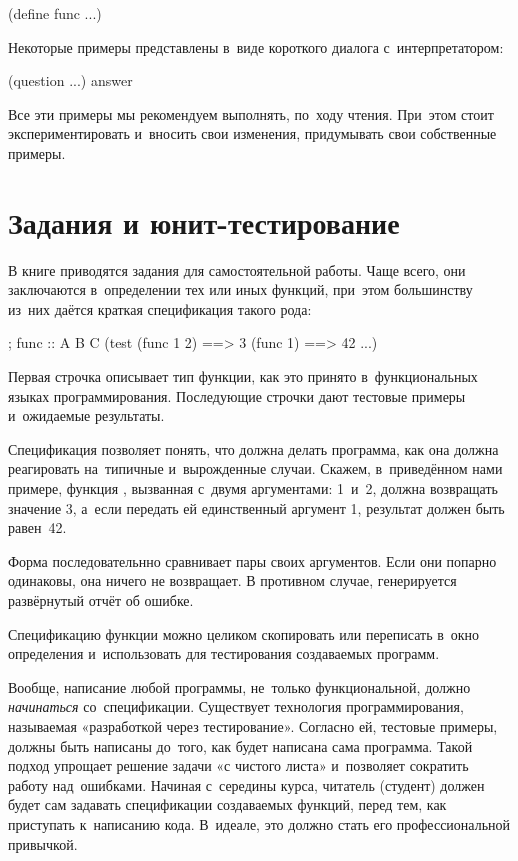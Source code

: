 \begin{Definition}
(define func
 ...)
\end{Definition}

Некоторые примеры представлены в~виде короткого диалога с~интерпретатором:

\REPL
  {(question ...)}
  {answer}

Все эти примеры мы рекомендуем выполнять, по~ходу чтения. При~этом стоит экспериментировать и~вносить свои изменения, придумывать свои собственные примеры.

\section{Задания и юнит-тестирование}%
В книге приводятся задания для самостоятельной работы. Чаще всего, они заключаются в~определении тех или иных функций, при~этом большинству из~них даётся краткая спецификация такого рода:

\begin{Specification}
; func :: A B \arrow C
(test 
  (func 1 2)  ==> 3
  (func 1)    ==> 42
  ...)
\end{Specification}

\noindent Первая строчка описывает тип функции, как это принято в~функциональных языках программирования. Последующие строчки дают тестовые примеры и~ожидаемые результаты. 

Спецификация позволяет понять, что должна делать программа, как она должна реагировать на~типичные и~вырожденные случаи. Скажем, в~приведённом нами примере, функция , вызванная с~двумя аргументами: 1~и~2, должна возвращать значение 3, а~если передать ей единственный аргумент 1, результат должен быть равен~42.

Форма   последовательнно сравнивает пары своих аргументов. Если они попарно одинаковы, она ничего не возвращает. В противном случае, генерируется развёрнутый отчёт об ошибке.

Спецификацию функции можно целиком скопировать или переписать в~окно определения  и~использовать для тестирования создаваемых программ.

Вообще, написание любой программы, не~только функциональной, должно \emph{начинаться} со~спецификации. Существует технология программирования, называемая «разработкой через тестирование». Согласно ей, тестовые примеры, должны быть написаны до~того, как будет написана сама программа. Такой подход упрощает решение задачи «с чистого листа» и~позволяет сократить работу над~ошибками. Начиная с~середины курса, читатель (студент) должен будет сам задавать спецификации создаваемых функций, перед тем, как приступать к~написанию кода. В~идеале, это должно стать его профессиональной привычкой.

